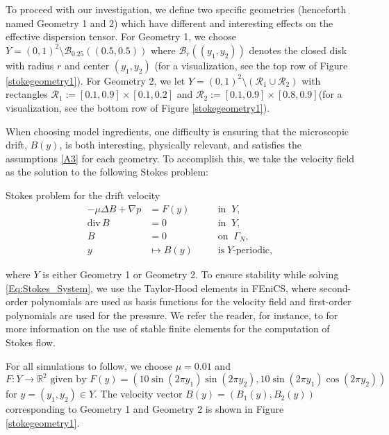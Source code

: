 \documentclass[11pt]{article}
\begin{document}
To proceed with our investigation, we define two specific geometries (henceforth named Geometry 1 and 2) which have different and interesting effects on the effective dispersion tensor.
 For Geometry 1, we choose  $Y = (0,1)^2 \setminus  \mathcal{B}_{0.25}((0.5, 0.5))$ where  $\mathcal{B}_{r}((y_1, y_2))$ denotes the closed disk with radius $r$ and center $(y_1, y_2)$ (for a visualization, see the top row of Figure \ref{stokegeometry1}). 
 For Geometry 2, we let $Y = (0,1)^2 \setminus  (\mathcal{R}_{1} \cup \mathcal{R}_{2})$ with rectangles $\mathcal{R}_{1}:= [0.1, 0.9] \times [0.1, 0.2]$ and $\mathcal{R}_{2}:= [0.1, 0.9] \times [0.8, 0.9]$(for a visualization, see the bottom row of Figure \ref{stokegeometry1}). 
 
When choosing model ingredients, one difficulty is ensuring that the microscopic drift, $B(y)$, is both interesting, physically relevant, and satisfies the assumptions {\ref{A3}} for each geometry.
To accomplish this, we take the velocity field as the solution to the following Stokes problem:

 \begin{mybox}{Stokes problem for the drift velocity}
 \vspace{-.4cm}
 \begin{subequations}\label{Eq:Stokes_System}
 \begin{alignat}{2}
 \label{stoke1}- \mu \Delta B + \nabla p &= F(y) \quad & &\text{in}\;\; Y,\\
 \label{stoke2}\text{div}\, B &= 0 \;\; & &\text{in}\;\; Y,\\
\label{stoke3}  B &= 0 \;\; & &\text{on} \;\;\Gamma_N,\\
 \label{stoke4} y&\mapsto B(y) &\;&\text{is} \; Y\text{-periodic}, 
 \end{alignat}
  \end{subequations}
\end{mybox}
\noindent where $Y$ is either Geometry 1 or Geometry 2.
To ensure stability while solving  \eqref{Eq:Stokes_System}, we use the Taylor-Hood elements in FEniCS, where second-order polynomials are used as basis functions for the velocity field and first-order polynomials are used for the pressure. We refer the reader, for instance, to \cite{arnold1984stable} for more information on the use of stable finite elements for the computation of Stokes flow. 


For all simulations to follow, we choose $\mu=0.01$ and
%
\[F:Y\to\mathbb{R}^2 \mbox{ given by }F(y) = (10\sin(2 \pi y_1) \sin(2\pi y_2), 10\sin(2 \pi y_1) \cos(2\pi y_2))\]
%
for $y=(y_1,y_2)\in Y$.
The velocity vector $B(y) = (B_{1}(y), B_{2}(y))$ corresponding to Geometry 1 and Geometry 2 is shown in Figure \ref{stokegeometry1}.
\end{document}

